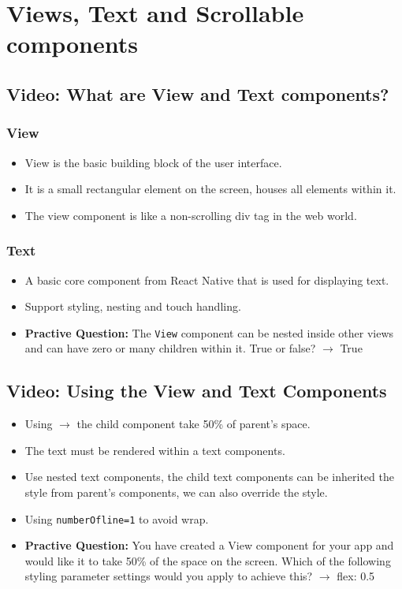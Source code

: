 \chapter{Views, Text and Scrollable components}

\section{Video: What are View and Text components?}
\subsection{View}

\begin{itemize}
    \item View is the basic building block of the user interface.
    \item It is a small rectangular element on the screen, houses all elements within it.
    \item The view component is like a non-scrolling div tag in the web world.
\end{itemize}

\subsection{Text}
\begin{itemize}
    \item A basic core component from React Native that is used for displaying text.
    \item Support styling, nesting and touch handling.

     \item \textbf{Practive Question:} The \texttt{View} component can be nested inside other views and can have zero or many children within it. True or false?
    $\rightarrow$ True
\end{itemize}

\section{Video: Using the View and Text Components}
\begin{itemize}
    \item Using  $\rightarrow$ the child component take 50\% of parent's space.
    \item The text must be rendered within a text components.
    \item Use nested text components, the child text components can be inherited the style from parent's components, we can also override the style.
    \item Using \texttt{numberOfline={1}} to avoid wrap.
    \item \textbf{Practive Question:} You have created a View component for your app and would like it to take 50\% of the space on the screen. Which of the following styling parameter settings would you apply to achieve this?
    $\rightarrow$ flex: 0.5
\end{itemize}

